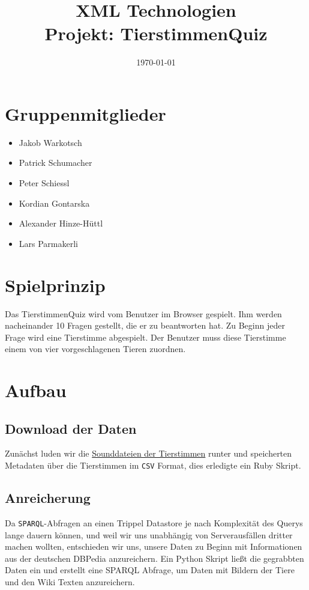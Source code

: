 \documentclass[a4paper,10pt]{article}
\title{\textbf{XML Technologien\\ Projekt: TierstimmenQuiz}}
\date{\today}
\begin{document}
\maketitle
\section{Gruppenmitglieder}
    \begin{itemize}
        \item Jakob Warkotsch
        \item Patrick Schumacher
        \item Peter Schiessl
        \item Kordian Gontarska
        \item Alexander Hinze-Hüttl
        \item Lars Parmakerli
    \end{itemize}

\section{Spielprinzip}
    Das TierstimmenQuiz wird vom Benutzer im Browser gespielt.
    Ihm werden nacheinander 10 Fragen gestellt, die er zu beantworten hat.
    Zu Beginn jeder Frage wird eine Tierstimme abgespielt. Der Benutzer muss 
    diese Tierstimme einem von vier vorgeschlagenen Tieren zuordnen.
    
\section{Aufbau}
        \subsection{Download der Daten}
        Zunächst luden wir die \href{http://offene-naturfuehrer.de/web/Open_Source_Tierstimmen}{Sounddateien der Tierstimmen} runter und speicherten
        Metadaten über die Tierstimmen im \texttt{CSV} Format, dies erledigte ein Ruby Skript.
        
        \subsection{Anreicherung}
            Da \texttt{SPARQL}-Abfragen an einen Trippel Datastore je nach Komplexität des Querys 
            lange dauern können, und weil wir uns unabhängig von Serverausfällen dritter machen
            wollten, entschieden wir uns, unsere Daten zu Beginn mit Informationen
            aus der deutschen DBPedia anzureichern. Ein Python Skript ließt 
            die gegrabbten Daten ein und erstellt eine SPARQL Abfrage, um Daten mit Bildern
            der Tiere und den Wiki Texten anzureichern.
            
\end{document}
